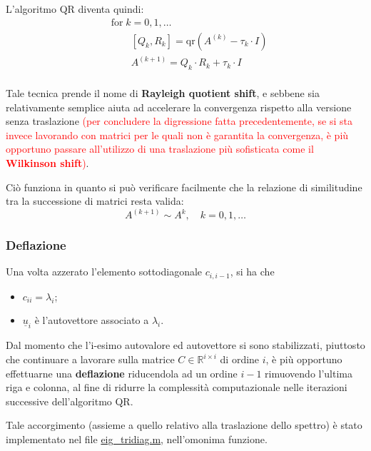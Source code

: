L'algoritmo QR diventa quindi:
\begin{align*}
&\text{for} \; k=0,1,\ldots \\
&\qquad [Q_k, R_k] = \text{qr}(A^{(k)} - \tau_k \cdot I) \\
&\qquad A^{(k+1)} = Q_k \cdot R_k + \tau_k \cdot I \\
\end{align*}

Tale tecnica prende il nome di \textbf{Rayleigh quotient shift}, e sebbene sia 
relativamente semplice aiuta ad accelerare la convergenza rispetto alla versione 
senza traslazione \textcolor{red}{(per concludere la digressione fatta 
precedentemente, se si sta invece lavorando con matrici per le quali non è 
garantita la convergenza, è più opportuno passare all'utilizzo di una 
traslazione più sofisticata come il \textbf{Wilkinson shift})}.

Ciò funziona in quanto si può verificare facilmente che la relazione di 
similitudine tra la successione di matrici resta valida:
\begin{equation*}
	A^{(k+1)} \sim A ^{k}, \quad k=0,1,\ldots
\end{equation*}

\subsubsection{Deflazione}
Una volta azzerato l'elemento sottodiagonale $c_{i,i-1}$, si ha che
\begin{itemize}
	\item $c_{ii} = \lambda_i$;
	\item $\underline{u}_i$ è l'autovettore associato a $\lambda_i$.
\end{itemize}

Dal momento che l'i-esimo autovalore ed autovettore si sono stabilizzati, 
piuttosto che continuare a lavorare sulla matrice $C \in \mathbb{R}^{i \times 
i}$ di ordine $i$, è più opportuno effettuarne una \textbf{deflazione} 
riducendola ad un ordine $i-1$ rimuovendo l'ultima riga e colonna, al fine di 
ridurre la complessità computazionale nelle iterazioni successive dell'algoritmo 
QR.

Tale accorgimento (assieme a quello relativo alla traslazione dello spettro) è 
stato implementato nel file 
\href{https://github.com/Yagotzirck/svd_benchmark/blob/main/src/eig_tridiag.m}{eig\_tridiag.m}, 
nell'omonima funzione.
